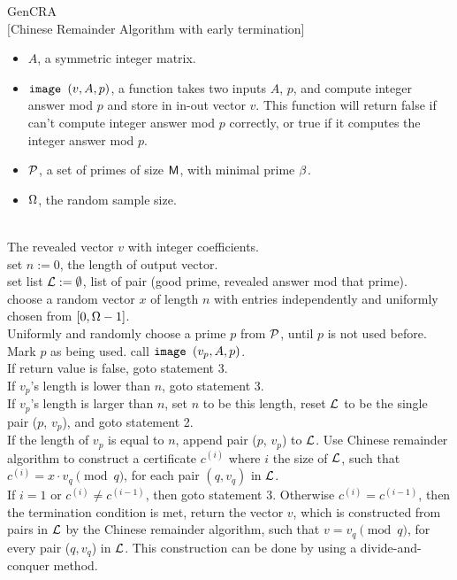 \begin{algorithm} {GenCRA}\\
$[$Chinese Remainder Algorithm with early termination] 
\Inspec
\begin{itemize}
\item
  $A$, a symmetric integer matrix.
\item
  $\mbox{\tt image }(v, A, p)$, a function takes two inputs $A$, $p$, and compute
  integer answer mod $p$ and store in in-out vector $v$.
  This function will return false if \reveal can't compute integer answer mod $p$ correctly,
  or true if it computes the integer answer mod $p$. 
\item
  $\mathcal P$, a set of primes of size $\mathsf M$, with minimal prime $\beta$.
\item
  $\Omega$, the random sample size.
\end{itemize}
\Outspec\\
The revealed vector $v$ with integer coefficients. \\
\Stmt[1.]
set $n := 0$, the length of output vector.\\
set list $\mathcal L := \emptyset$, list of pair (good prime, revealed answer
 mod that prime).\\
\Stmt[2.]
choose a random vector $x$ of length $n$ with
entries independently and uniformly chosen 
from $[0, \Omega - 1]$.\\
\Stmt[3.]
Uniformly and randomly choose a prime $p$ from $\mathcal P$,
until $p$ is not used before. 
Mark $p$ as being used.
call $\mbox{\tt image }(v_p, A, p)$.\\ 
If return value is false, goto statement 3.\\
If $v_p$'s length is lower than $n$, goto statement 3.\\
If $v_p$'s length is larger than $n$, set $n$ to be this length,
reset $\mathcal L$ to be the single pair ($p$, $v_p$),
and goto statement 2.\\
If the length of $v_p$ is equal to $n$, append pair ($p$, $v_p$) to $\mathcal L$.
Use Chinese remainder algorithm to construct 
a certificate $c^{(i)}$ where $i$ the size of $\mathcal L$, such that
$c^{(i)} = x \cdot v_{q} \pmod {q}$, for each pair $(q, v_q)$ in $\mathcal L$.\\
\Stmt[4.]
If $i = 1$ or $c^{(i)} \not= c^{(i-1)}$, then goto statement 3.
Otherwise $c^{(i)} = c^{(i-1)}$,
then the termination condition is met,
return the vector $v$, which is
constructed from pairs in $\mathcal L$ by the Chinese remainder algorithm,
such that $v = v_q \pmod q$, for every pair ($q, v_q$) in $\mathcal L$.
This construction can be done by using a divide-and-conquer method. 
\end{algorithm}
